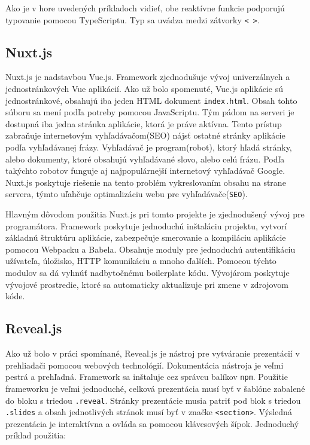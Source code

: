 Ako je v hore uvedených príkladoch vidieť, obe reaktívne funkcie podporujú typovanie pomocou TypeScriptu. Typ sa uvádza medzi zátvorky \texttt{< >}.

\subsection{Nuxt.js}
\label{nuxt}
Nuxt.js je nadstavbou Vue.js. Framework zjednodušuje vývoj univerzálnych a jednostránkových Vue aplikácií. Ako už bolo spomenuté, Vue.js aplikácie sú jednostránkové, obsahujú iba jeden HTML dokument \texttt{index.html}. Obsah tohto súboru sa mení podľa potreby pomocou JavaScriptu. Tým pádom na serveri je dostupná iba jedna stránka aplikácie, ktorá je práve aktívna. Tento prístup zabraňuje internetovým vyhľadávačom(SEO) nájsť ostatné stránky aplikácie podľa vyhľadávanej frázy. Vyhľadávač je program(robot), ktorý hľadá stránky, alebo dokumenty, ktoré obsahujú vyhľadávané slovo, alebo celú frázu. Podľa takýchto robotov funguje aj najpopulárnejší internetový vyhľadávač Google. Nuxt.js poskytuje riešenie na tento problém vykreslovaním obsahu na strane servera, týmto uľahčuje optimalizáciu webu pre vyhľadávače(\texttt{SEO}).

Hlavným dôvodom použitia Nuxt.js pri tomto projekte je zjednodušený vývoj pre programátora. Framework poskytuje jednoduchú inštaláciu projektu, vytvorí základnú štruktúru aplikácie, zabezpečuje smerovanie a kompiláciu aplikácie pomocou Webpacku a Babela. Obsahuje moduly pre jednoduchú autentifikáciu užívateľa, úložisko, HTTP komunikáciu a mnoho ďalších. Pomocou týchto modulov sa dá vyhnúť nadbytočnému boilerplate kódu. Vývojárom poskytuje vývojové prostredie, ktoré sa automaticky aktualizuje pri zmene v zdrojovom kóde.

\subsection{Reveal.js}
\label{reveal}
Ako už bolo v práci spomínané, Reveal.js je nástroj pre vytváranie prezentácií v prehliadači pomocou webových technológií. Dokumentácia nástroja je veľmi pestrá a prehľadná. Framework sa inštaluje cez správcu balíkov \texttt{npm}. Použitie frameworku je veľmi jednoduché, celková prezentácia musí byť v šablóne zabalené do bloku s triedou \texttt{.reveal}. Stránky prezentácie musia patriť pod blok s triedou \texttt{.slides} a obsah jednotlivých stránok musí byť v značke \texttt{<section>}. Výsledná prezentácia je interaktívna a ovláda sa pomocou klávesových šípok. Jednoduchý príklad použitia:

